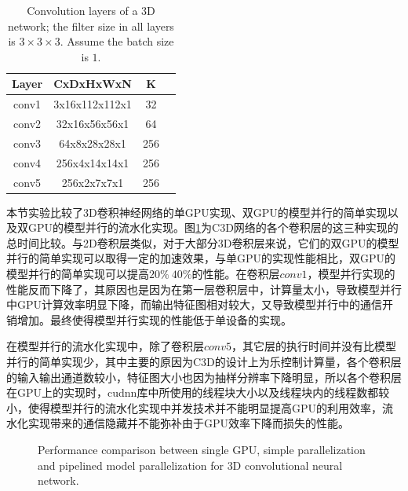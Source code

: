 \begin{table}[]
\centering
\caption{Convolution layers of a 3D network; the filter size in all layers is $3\times 3\times 3$. Assume the batch size is $1$.}
\label{conv3d-info}
\begin{tabular}{|c|c|c|c|}
\hline
Layer & CxDxHxWxN       & K   \\ \hline
conv1 & 3x16x112x112x1 & 32   \\ \hline
conv2 & 32x16x56x56x1  & 64   \\ \hline
conv3 & 64x8x28x28x1   & 256  \\ \hline
conv4 & 256x4x14x14x1  & 256  \\ \hline
conv5 & 256x2x7x7x1    & 256  \\ \hline
\end{tabular}
\end{table} 

本节实验比较了3D卷积神经网络的单GPU实现、双GPU的模型并行的简单实现以及双GPU的模型并行的流水化实现。图\ref{3DSimpleAndPipelined}为C3D网络的各个卷积层的这三种实现的总时间比较。与2D卷积层类似，对于大部分3D卷积层来说，它们的双GPU的模型并行的简单实现可以取得一定的加速效果，与单GPU的实现性能相比，双GPU的模型并行的简单实现可以提高$20\%~40\%$的性能。在卷积层$conv1$，模型并行实现的性能反而下降了，其原因也是因为在第一层卷积层中，计算量太小，导致模型并行中GPU计算效率明显下降，而输出特征图相对较大，又导致模型并行中的通信开销增加。最终使得模型并行实现的性能低于单设备的实现。

在模型并行的流水化实现中，除了卷积层$conv5$，其它层的执行时间并没有比模型并行的简单实现少，其中主要的原因为C3D的设计上为乐控制计算量，各个卷积层的输入输出通道数较小，特征图大小也因为抽样分辨率下降明显，所以各个卷积层在GPU上的实现时，cudnn库中所使用的线程块大小以及线程块内的线程数都较小，使得模型并行的流水化实现中并发技术并不能明显提高GPU的利用效率，流水化实现带来的通信隐藏并不能弥补由于GPU效率下降而损失的性能。

\begin{figure}[tbh]%
\centering
{}
\caption{Performance comparison between single GPU, simple parallelization and pipelined model parallelization for 3D convolutional neural network.}
\label{3DSimpleAndPipelined}
\end{figure}

